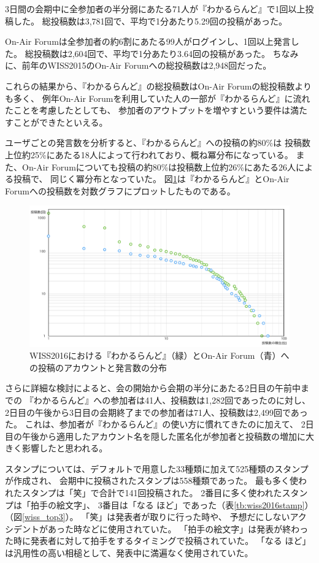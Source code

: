 3日間の会期中に全参加者の半分弱にあたる71人が『わかるらんど』で1回以上投稿した。
総投稿数は3,781回で、平均で1分あたり5.29回の投稿があった。

On-Air Forumは全参加者の約6割にあたる99人がログインし、1回以上発言した。
総投稿数は2,604回で、平均で1分あたり3.64回の投稿があった。
ちなみに、前年のWISS2015のOn-Air Forumへの総投稿数は2,948回だった。

これらの結果から、『わかるらんど』の総投稿数はOn-Air Forumの総投稿数よりも多く、
例年On-Air Forumを利用していた人の一部が『わかるらんど』に流れたことを考慮したとしても、
参加者のアウトプットを増やすという要件は満たすことができたといえる。

ユーザごとの発言数を分析すると、『わかるらんど』への投稿の約80\%は
投稿数上位約25\%にあたる18人によって行われており、概ね冪分布になっている。
また、On-Air Forumについても投稿の約80\%は投稿数上位約26\%にあたる26人による投稿で、
同じく冪分布となっていた。
図\ref{wiss2016compare}は『わかるらんど』とOn-Air Forumへの投稿数を対数グラフにプロットしたものである。

\begin{figure}[H]
\centering
\includegraphics[width=12cm]{images/wiss2016compare.png}
\caption{WISS2016における『わかるらんど』（緑）とOn-Air Forum（青）への投稿のアカウントと発言数の分布}
\label{wiss2016compare}
\end{figure}

さらに詳細な検討によると、会の開始から会期の半分にあたる2日目の午前中までの
『わかるらんど』への参加者は41人、投稿数は1,282回であったのに対し、
2日目の午後から3日目の会期終了までの参加者は71人、投稿数は2,499回であった。
これは、参加者が『わかるらんど』の使い方に慣れてきたのに加えて、
2日目の午後から適用したアカウント名を隠した匿名化が参加者と投稿数の増加に大きく影響したと思われる。

スタンプについては、デフォルトで用意した33種類に加えて525種類のスタンプが作成され、
会期中に投稿されたスタンプは558種類であった。
最も多く使われたスタンプは「笑」で合計で141回投稿された。
2番目に多く使われたスタンプは「拍手の絵文字」、
3番目は「なる ほど」であった（表\ref{tb:wiss2016stamp}）（図\ref{wiss_top3}）。
「笑」は発表者が取りに行った時や、
予想だにしないアクシデントがあった時などに使用されていた。
「拍手の絵文字」は発表が終わった時に発表者に対して拍手をするタイミングで投稿されていた。
「なる ほど」は汎用性の高い相槌として、発表中に満遍なく使用されていた。

